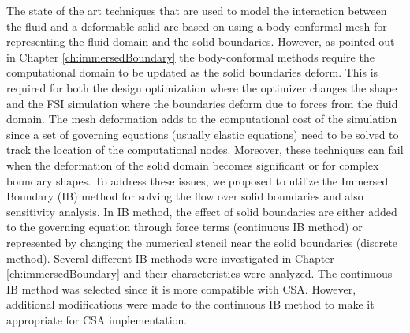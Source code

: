The state of the art techniques that are used to model the interaction between the fluid and a deformable solid are based on using a body conformal mesh for representing the fluid domain and the solid boundaries. However, as pointed out in Chapter \ref{ch:immersedBoundary} the body-conformal methods require the computational domain to be updated as the solid boundaries deform. This is required for both the design optimization where the optimizer changes the shape and the FSI simulation where the boundaries deform due to forces from the fluid domain. The mesh deformation adds to the computational cost of the simulation since a set of governing equations (usually elastic equations) need to be solved to track the location of the computational nodes. Moreover, these techniques can fail when the deformation of the solid domain becomes significant or for complex boundary shapes. To address these issues, we proposed to utilize the Immersed Boundary (IB) method for solving the flow over solid boundaries and also sensitivity analysis. In IB method, the effect of solid boundaries are either added to the governing equation through force terms (continuous IB method) or represented by changing the numerical stencil near the solid boundaries (discrete method). Several different IB methods were investigated in Chapter \ref{ch:immersedBoundary} and their characteristics were analyzed. The continuous IB method was selected since it is more compatible with CSA. However, additional modifications were made to the continuous IB method to make it appropriate for CSA implementation.

